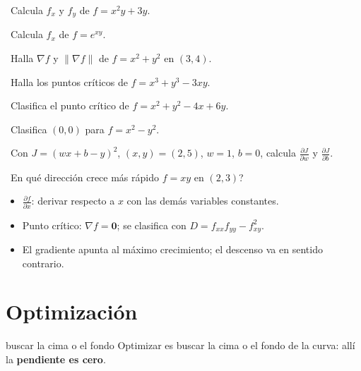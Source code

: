 \begin{tmejercicios}
\label{ej:4-3}
\begin{tmlista}
\item \tmbasico\ Calcula $f_x$ y $f_y$ de $f=x^2y+3y$.
\item \tmbasico\ Calcula $f_x$ de $f=e^{xy}$.
\item \tmbasico\ Halla $\nabla f$ y $\|\nabla f\|$ de $f=x^2+y^2$ en $(3, 4)$.
\item \tmmedio\ Halla los puntos cr\'iticos de $f=x^3+y^3-3xy$.
\item \tmmedio\ Clasifica el punto cr\'itico de $f=x^2+y^2-4x+6y$.
\item \tmmedio\ Clasifica $(0, 0)$ para $f=x^2-y^2$.
\item \tmdificil\ Con $J=(wx+b-y)^2$, $(x, y)=(2, 5)$, $w=1$, $b=0$, calcula $\frac{\partial J}{\partial w}$ y $\frac{\partial J}{\partial b}$.
\item \tmdificil\ \textquestiondown En qu\'e direcci\'on crece m\'as r\'apido $f=xy$ en $(2, 3)$?
\end{tmlista}
\end{tmejercicios}


\begin{tmresumen}
\begin{itemize}
\item $\frac{\partial f}{\partial x}$: derivar respecto a $x$ con las dem\'as variables constantes.
\item Punto cr\'itico: $\nabla f=\mathbf 0$; se clasifica con $D=f_{xx}f_{yy}-f_{xy}^2$.
\item El gradiente apunta al m\'aximo crecimiento; el descenso va en sentido contrario.
\end{itemize}
\end{tmresumen}

\section{Optimizaci\'on}
\label{sec:4-4}

\begin{tmconcepto}{buscar la cima o el fondo}
Optimizar es buscar la cima o el fondo de la curva: all\'i la \textbf{pendiente es cero}.
\end{tmconcepto}

